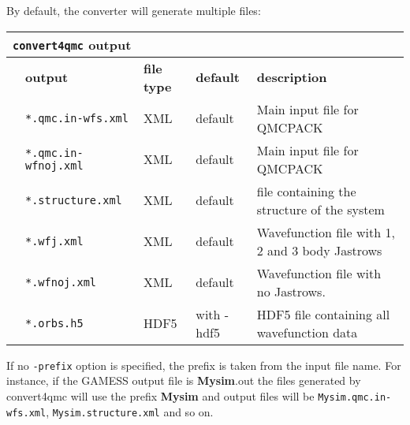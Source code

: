 By default, the converter will generate multiple files:\\
\begin{table}[h]
\begin{center}
\begin{tabularx}{\textwidth}{l l l l l }
\hline
\multicolumn{5}{l}{\texttt{convert4qmc} output} \\
\hline
   &   \bfseries output     & \bfseries file type & \bfseries default   & \bfseries description \\
   &   \texttt{*.qmc.in-wfs.xml             } &  XML  & default& Main input file for QMCPACK\\
   &   \texttt{*.qmc.in-wfnoj.xml             } &  XML  & default& Main input file for QMCPACK\\
   &   \texttt{*.structure.xml             } &  XML   &default   & file containing the structure of the system\\
   &   \texttt{*.wfj.xml             } &  XML  & default & Wavefunction file with 1, 2 and 3 body Jastrows\\
   &   \texttt{*.wfnoj.xml             } &  XML   & default & Wavefunction file with no Jastrows. \\
   &   \texttt{*.orbs.h5             } &  HDF5   & with -hdf5   & HDF5 file containing all wavefunction data\\
    \hline
    \end{tabularx}
\end{center}
\end{table}

If no \texttt{-prefix} option is specified, the prefix is taken from
the input file name. For instance, if the GAMESS output file is
\textbf{Mysim}.out the files generated by convert4qmc will use the
prefix \textbf{Mysim} and output files will be
\texttt{Mysim.qmc.in-wfs.xml}, \texttt{Mysim.structure.xml} and so on.


